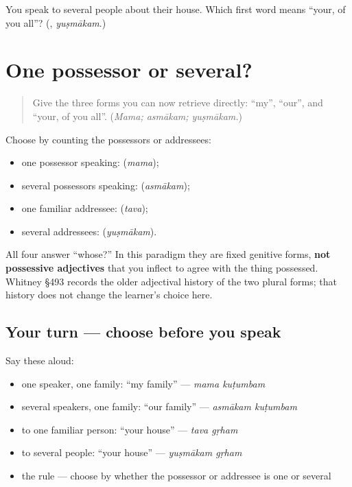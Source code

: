 \begin{tcolorbox}[breakable,colback=teal!4,colframe=teal!35!black,title={Before you move on}]
You speak to several people about their house. Which first word means “your, of you all”? (\textbf{}, \emph{yuṣmākam}.)
\end{tcolorbox}
\section[Practice]{One possessor or several?}

\label{lesson:SA-C259-plural-possessors-practice}



\begin{quote}
Give the three forms you can now retrieve directly: “my”, “our”, and “your, of you all”. (\emph{Mama; asmākam; yuṣmākam.})
\end{quote}

\begin{grammarlens}[title={Grammar Lens: the choice}]
Choose by counting the possessors or addressees:

\begin{itemize}
\raggedright
  \item one possessor speaking: \textbf{} (\emph{mama});
  \item several possessors speaking: \textbf{} (\emph{asmākam});
  \item one familiar addressee: \textbf{} (\emph{tava});
  \item several addressees: \textbf{} (\emph{yuṣmākam}).
\end{itemize}

All four answer “whose?” In this paradigm they are fixed genitive forms, \textbf{not possessive adjectives} that you inflect to agree with the thing possessed. Whitney §493 records the older adjectival history of the two plural forms; that history does not change the learner's choice here.
\end{grammarlens}

\subsection*{Your turn — choose before you speak}
Say these aloud:

\begin{itemize}
\raggedright
  \item one speaker, one family: “my family” — \emph{mama kuṭumbam}
  \item several speakers, one family: “our family” — \emph{asmākam kuṭumbam}
  \item to one familiar person: “your house” — \emph{tava gṛham}
  \item to several people: “your house” — \emph{yuṣmākam gṛham}
  \item the rule — choose by whether the possessor or addressee is one or several
\end{itemize}

